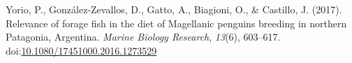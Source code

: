 \documentclass[
]{article}
\newlength{\cslhangindent}
\newenvironment{CSLReferences}[2] %
 {\begin{list}{}{%
  \setlength{\itemindent}{0pt}
  \setlength{\leftmargin}{0pt}
  \setlength{\parsep}{0pt}
  \ifodd #1
   \setlength{\leftmargin}{\cslhangindent}
   \setlength{\itemindent}{-1\cslhangindent}
  \fi
  \setlength{\itemsep}{#2\baselineskip}}}
 {\end{list}}
\begin{document}
\begin{CSLReferences}{1}{0}
Yorio, P., González-Zevallos, D., Gatto, A., Biagioni, O., \& Castillo,
J. (2017). Relevance of forage fish in the diet of {Magellanic} penguins
breeding in northern {Patagonia}, {Argentina}. \emph{Marine Biology
Research}, \emph{13}(6), 603--617.
doi:\href{https://doi.org/10.1080/17451000.2016.1273529}{10.1080/17451000.2016.1273529}

\end{CSLReferences}
\end{document}
